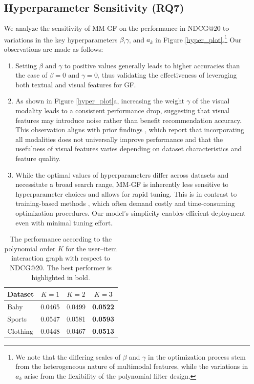\documentclass[a4paper,fleqn]{cas-sc}
\renewcommand{\cite}{\citep}
\begin{document}
\subsection{Hyperparameter Sensitivity (RQ7)}
\label{hyperparameter sensitivity}

We analyze the sensitivity of \textsf{MM-GF} on the performance in NDCG@$20$ to variations in the key hyperparameters $\beta$,$\gamma$, and $a_k$ in Figure \ref{hyper_plot}.\footnote{We note that the differing scales of $\beta$ and $\gamma$ in the optimization process stem from the heterogeneous nature of multimodal features, while the variations in $a_k$ arise from the flexibility of the polynomial filter design.} Our observations are made as follows:

\begin{enumerate}[label=(\roman*)]
    \item Setting $\beta$ and $\gamma$ to positive values generally leads to higher accuracies than the case of $\beta=0$ and $\gamma=0$, thus validating the effectiveness of leveraging both textual and visual features for GF.

    \item As shown in Figure \ref{hyper_plot}a, increasing the weight $\gamma$ of the visual modality leads to a consistent performance drop, suggesting that visual features may introduce noise rather than benefit recommendation accuracy. This observation aligns with prior findings \cite{zhou2023comprehensive}, which report that incorporating all modalities does not universally improve performance and that the usefulness of visual features varies depending on dataset characteristics and feature quality.

    \item While the optimal values of hyperparameters differ across datasets and necessitate a broad search range, \textsf{MM-GF} is inherently less sensitive to hyperparameter choices and allows for rapid tuning. This is in contrast to training-based methods \cite{DBLP:conf/mm/WeiWN0C20,DBLP:conf/mm/Zhang00WWW21, DBLP:conf/mm/Yu0LB23, DBLP:conf/mm/ZhouS23}, which often demand costly and time-consuming optimization procedures. Our model’s simplicity enables efficient deployment even with minimal tuning effort.
\end{enumerate}


\begin{table}[t]
\centering
\caption{The performance according to the polynomial order $K$ for the user--item interaction graph with respect to NDCG@20. The best performer is highlighted in bold.}
\label{K_diff}
\begin{tabular}{l|ccc}
\toprule
Dataset  & $K = 1$  & $K = 2$  & $K = 3$ \\
\midrule
Baby     & 0.0465   & 0.0499   & \textbf{0.0522} \\
Sports   & 0.0547   & 0.0581   & \textbf{0.0593} \\
Clothing & 0.0448   & 0.0467   & \textbf{0.0513} \\
\bottomrule
\end{tabular}
\end{table}
\end{document}
